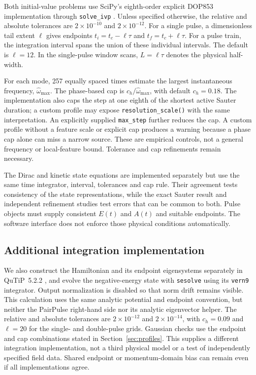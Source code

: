 \documentclass[11pt,a4paper]{article}
\begin{document}
Both initial-value problems use SciPy's eighth-order explicit DOP853 implementation through \texttt{solve\_ivp} \cite{Virtanen2020}. Unless specified otherwise, the relative and absolute tolerances are $2\times10^{-10}$ and $2\times10^{-12}$. For a single pulse, a dimensionless tail extent $\ell$ gives endpoints $t_i=t_c-\ell\tau$ and $t_f=t_c+\ell\tau$. For a pulse train, the integration interval spans the union of these individual intervals. The default is $\ell=12$. In the single-pulse window scans, $L=\ell\tau$ denotes the physical half-width.

For each mode, 257 equally spaced times estimate the largest instantaneous frequency, $\widehat\omega_{\max}$. The phase-based cap is $c_h/\widehat\omega_{\max}$, with default $c_h=0.18$. The implementation also caps the step at one eighth of the shortest active Sauter duration; a custom profile may expose \texttt{resolution\_scale()} with the same interpretation. An explicitly supplied \texttt{max\_step} further reduces the cap. A custom profile without a feature scale or explicit cap produces a warning because a phase cap alone can miss a narrow source. These are empirical controls, not a general frequency or local-feature bound. Tolerance and cap refinements remain necessary.

The Dirac and kinetic state equations are implemented separately but use the same time integrator, interval, tolerances and cap rule. Their agreement tests consistency of the state representations, while the exact Sauter result and independent refinement studies test errors that can be common to both. Pulse objects must supply consistent $E(t)$ and $A(t)$ and suitable endpoints. The software interface does not enforce those physical conditions automatically.

\subsection{Additional integration implementation}
\label{sec:independent}

We also construct the Hamiltonian and its endpoint eigensystems separately in QuTiP~5.2.2 \cite{Lambert2026}, and evolve the negative-energy state with \texttt{sesolve} using its \texttt{vern9} integrator. Output normalization is disabled so that norm drift remains visible. This calculation uses the same analytic potential and endpoint convention, but neither the PairPulse right-hand side nor its analytic eigenvector helper. The relative and absolute tolerances are $2\times10^{-12}$ and $2\times10^{-14}$, with $c_h=0.09$ and $\ell=20$ for the single- and double-pulse grids. Gaussian checks use the endpoint and cap combinations stated in Section~\ref{sec:profiles}. This supplies a different integration implementation, not a third physical model or a test of independently specified field data. Shared endpoint or momentum-domain bias can remain even if all implementations agree.
\end{document}
